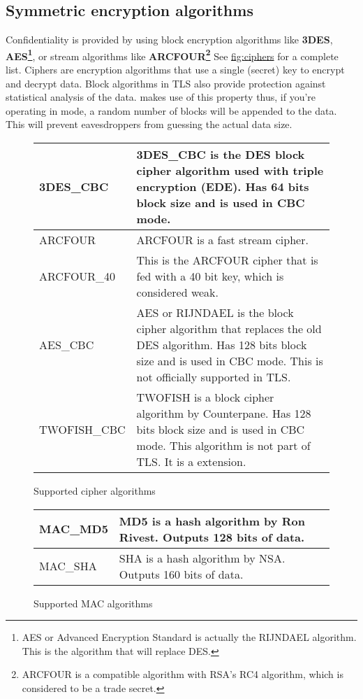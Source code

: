 \subsection{Symmetric encryption algorithms}
\par
Confidentiality is provided by using block encryption algorithms like {\bf 3DES}, 
{\bf AES\footnote{AES or Advanced Encryption Standard is actually the RIJNDAEL algorithm. This is the
algorithm that will replace DES.}}, or
stream algorithms like {\bf ARCFOUR\footnote{ARCFOUR is a compatible
algorithm with RSA's RC4 algorithm, which is considered to be a trade secret.}} See \hyperref{fig:ciphers}{figure }{}{fig:ciphers} for a complete list. 
Ciphers are encryption algorithms that use a single (secret) key
to encrypt and decrypt data. Block algorithms in TLS also provide protection
against statistical analysis of the data. \gnutls{} makes use of this property
thus, if you're operating in \tlsI{} mode, a random number of blocks will be
appended to the data. This will prevent eavesdroppers from guessing the 
actual data size.

\begin{figure}[hbtp]
\begin{tabular}{|l|p{9cm}|}

\hline
3DES\_CBC & 3DES\_CBC is the DES block cipher algorithm used with triple
encryption (EDE). Has 64 bits block size and is used in CBC mode.
\\
\hline
ARCFOUR & ARCFOUR is a fast stream cipher.
\\
\hline
ARCFOUR\_40 & This is the ARCFOUR cipher that is fed with a 40 bit key,
which is considered weak.
\\
\hline
AES\_CBC & AES or RIJNDAEL is the block cipher algorithm that replaces 
the old DES algorithm. Has
128 bits block size and is used in CBC mode. This is not officially
supported in TLS.
\\
\hline
TWOFISH\_CBC & TWOFISH is a block cipher algorithm by Counterpane. Has
128 bits block size and is used in CBC mode. This algorithm is not
part of TLS. It is a \gnutls{} extension.
\\
\hline
\end{tabular}
\caption{Supported cipher algorithms}
\label{fig:ciphers}
\end{figure}



\addvspace{1.5cm}

\begin{figure}[hbtp]
\begin{tabular}{|l|p{9cm}|}

\hline
MAC\_MD5 & MD5 is a hash algorithm by Ron Rivest. Outputs 128 bits of data.
\\
\hline
MAC\_SHA & SHA is a hash algorithm by NSA. Outputs 160 bits of data.
\\
\hline
\end{tabular}
\caption{Supported MAC algorithms}
\label{fig:mac}
\end{figure}

